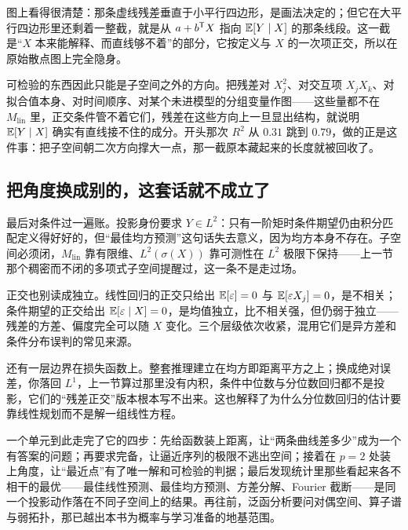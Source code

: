 图上看得很清楚：那条虚线残差垂直于小平行四边形，是画法决定的；但它在大平行四边形里还剩着一整截，就是从 \(a+b^{\mathsf{T}}X\) 指向 \(\mathbb{E}[Y\mid X]\) 的那条线段。这一截是``\(X\) 本来能解释、而直线够不着''的部分，它按定义与 \(X\) 的一次项正交，所以在原始散点图上完全隐身。

可检验的东西因此只能是子空间之外的方向。把残差对 \(X_j^2\)、对交互项 \(X_jX_k\)、对拟合值本身、对时间顺序、对某个未进模型的分组变量作图——这些量都不在 \(M_{\mathrm{lin}}\) 里，正交条件管不着它们，残差在这些方向上一旦显出结构，就说明 \(\mathbb{E}[Y\mid X]\) 确实有直线接不住的成分。开头那次 \(R^2\) 从 \(0.31\) 跳到 \(0.79\)，做的正是这件事：把子空间朝二次方向撑大一点，那一截原本藏起来的长度就被回收了。

\subsection{把角度换成别的，这套话就不成立了}

最后对条件过一遍账。投影身份要求 \(Y\in L^2\)：只有一阶矩时条件期望仍由积分匹配定义得好好的，但``最佳均方预测''这句话失去意义，因为均方本身不存在。子空间必须闭，\(M_{\mathrm{lin}}\) 靠有限维、\(L^2(\sigma(X))\) 靠可测性在 \(L^2\) 极限下保持——上一节那个稠密而不闭的多项式子空间提醒过，这一条不是走过场。

正交也别读成独立。线性回归的正交只给出 \(\mathbb{E}[\varepsilon]=0\) 与 \(\mathbb{E}[\varepsilon X_j]=0\)，是不相关；条件期望的正交给出 \(\mathbb{E}[\varepsilon\mid X]=0\)，是均值独立，比不相关强，但仍弱于独立——残差的方差、偏度完全可以随 \(X\) 变化。三个层级依次收紧，混用它们是异方差和条件分布误判的常见来源。

还有一层边界在损失函数上。整套推理建立在均方即距离平方之上；换成绝对误差，你落回 \(L^1\)，上一节算过那里没有内积，条件中位数与分位数回归都不是投影，它们的``残差正交''版本根本写不出来。这也解释了为什么分位数回归的估计要靠线性规划而不是解一组线性方程。

一个单元到此走完了它的四步：先给函数装上距离，让``两条曲线差多少''成为一个有答案的问题；再要求完备，让逼近序列的极限不逃出空间；接着在 \(p=2\) 处装上角度，让``最近点''有了唯一解和可检验的判据；最后发现统计里那些看起来各不相干的最优——最佳线性预测、最佳均方预测、方差分解、Fourier 截断——是同一个投影动作落在不同子空间上的结果。再往前，泛函分析要问对偶空间、算子谱与弱拓扑，那已越出本书为概率与学习准备的地基范围。
